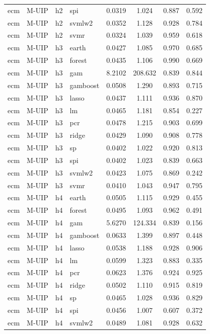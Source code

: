 \begin{ThreePartTable}
\begin{longtable}[t]{llclcccc}
ecm & M-UIP & h2 & spi & 0.0319 & 1.024 & 0.887 & 0.592\\
ecm & M-UIP & h2 & svmlw2 & 0.0352 & 1.128 & 0.928 & 0.784\\
ecm & M-UIP & h2 & svmr & 0.0324 & 1.039 & 0.959 & 0.618\\
\addlinespace
ecm & M-UIP & h3 & earth & 0.0427 & 1.085 & 0.970 & 0.685\\
ecm & M-UIP & h3 & forest & 0.0435 & 1.106 & 0.990 & 0.669\\
ecm & M-UIP & h3 & gam & 8.2102 & 208.632 & 0.839 & 0.844\\
ecm & M-UIP & h3 & gamboost & 0.0508 & 1.290 & 0.893 & 0.715\\
ecm & M-UIP & h3 & lasso & 0.0437 & 1.111 & 0.936 & 0.870\\
ecm & M-UIP & h3 & lm & 0.0465 & 1.181 & 0.854 & 0.227\\
ecm & M-UIP & h3 & pcr & 0.0478 & 1.215 & 0.903 & 0.699\\
ecm & M-UIP & h3 & ridge & 0.0429 & 1.090 & 0.908 & 0.778\\
ecm & M-UIP & h3 & sp & 0.0402 & 1.022 & 0.920 & 0.813\\
ecm & M-UIP & h3 & spi & 0.0402 & 1.023 & 0.839 & 0.663\\
ecm & M-UIP & h3 & svmlw2 & 0.0423 & 1.075 & 0.869 & 0.242\\
ecm & M-UIP & h3 & svmr & 0.0410 & 1.043 & 0.947 & 0.795\\
\addlinespace
ecm & M-UIP & h4 & earth & 0.0505 & 1.115 & 0.929 & 0.455\\
ecm & M-UIP & h4 & forest & 0.0495 & 1.093 & 0.962 & 0.491\\
ecm & M-UIP & h4 & gam & 5.6270 & 124.334 & 0.839 & 0.156\\
ecm & M-UIP & h4 & gamboost & 0.0633 & 1.399 & 0.897 & 0.448\\
ecm & M-UIP & h4 & lasso & 0.0538 & 1.188 & 0.928 & 0.906\\
ecm & M-UIP & h4 & lm & 0.0599 & 1.323 & 0.883 & 0.335\\
ecm & M-UIP & h4 & pcr & 0.0623 & 1.376 & 0.924 & 0.925\\
ecm & M-UIP & h4 & ridge & 0.0502 & 1.110 & 0.915 & 0.819\\
ecm & M-UIP & h4 & sp & 0.0465 & 1.028 & 0.936 & 0.829\\
ecm & M-UIP & h4 & spi & 0.0456 & 1.007 & 0.607 & 0.372\\
ecm & M-UIP & h4 & svmlw2 & 0.0489 & 1.081 & 0.928 & 0.632\\

\end{longtable}
\end{ThreePartTable}

